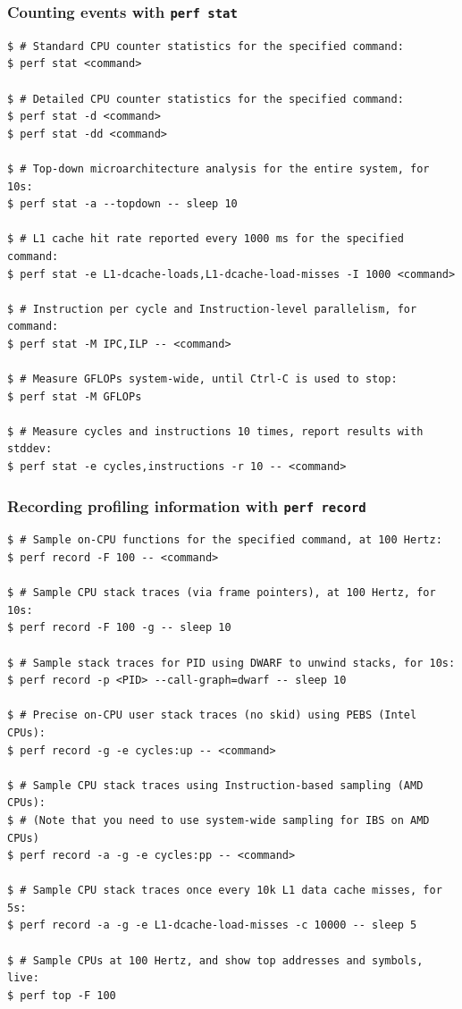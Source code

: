 \begin{frame}[fragile]
  \frametitle{Counting events with \texttt{perf stat}}
  { \scriptsize
    \begin{block}{}
      \begin{verbatim}
$ # Standard CPU counter statistics for the specified command:
$ perf stat <command>

$ # Detailed CPU counter statistics for the specified command:
$ perf stat -d <command>
$ perf stat -dd <command>

$ # Top-down microarchitecture analysis for the entire system, for 10s:
$ perf stat -a --topdown -- sleep 10

$ # L1 cache hit rate reported every 1000 ms for the specified command:
$ perf stat -e L1-dcache-loads,L1-dcache-load-misses -I 1000 <command>

$ # Instruction per cycle and Instruction-level parallelism, for command:
$ perf stat -M IPC,ILP -- <command>

$ # Measure GFLOPs system-wide, until Ctrl-C is used to stop:
$ perf stat -M GFLOPs

$ # Measure cycles and instructions 10 times, report results with stddev:
$ perf stat -e cycles,instructions -r 10 -- <command>
      \end{verbatim}
    \end{block}
  }
\end{frame}


\begin{frame}[fragile]
  \frametitle{Recording profiling information with \texttt{perf record}}
  { \scriptsize
    \begin{block}{}
      \begin{verbatim}
$ # Sample on-CPU functions for the specified command, at 100 Hertz:
$ perf record -F 100 -- <command>

$ # Sample CPU stack traces (via frame pointers), at 100 Hertz, for 10s:
$ perf record -F 100 -g -- sleep 10

$ # Sample stack traces for PID using DWARF to unwind stacks, for 10s:
$ perf record -p <PID> --call-graph=dwarf -- sleep 10

$ # Precise on-CPU user stack traces (no skid) using PEBS (Intel CPUs):
$ perf record -g -e cycles:up -- <command>

$ # Sample CPU stack traces using Instruction-based sampling (AMD CPUs):
$ # (Note that you need to use system-wide sampling for IBS on AMD CPUs)
$ perf record -a -g -e cycles:pp -- <command>

$ # Sample CPU stack traces once every 10k L1 data cache misses, for 5s:
$ perf record -a -g -e L1-dcache-load-misses -c 10000 -- sleep 5

$ # Sample CPUs at 100 Hertz, and show top addresses and symbols, live:
$ perf top -F 100
      \end{verbatim}
    \end{block}
  }
\end{frame}

